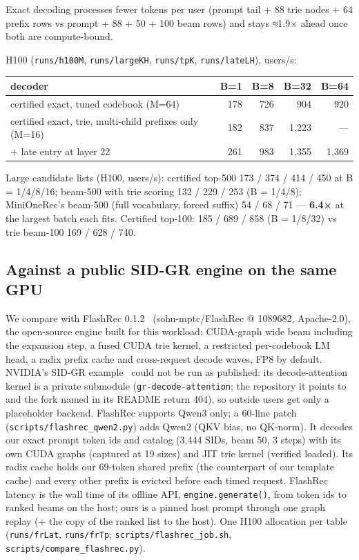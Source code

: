 \documentclass[11pt]{article}
\newcommand{\code}[1]{\texttt{#1}}
\begin{document}
Exact decoding processes fewer tokens per user (prompt tail + 88 trie nodes + 64 prefix rows vs prompt + 88 + 50 + 100 beam rows) and stays ≈1.9× ahead once both are compute-bound.

H100 (\code{runs/\allowbreak{}h100M}, \code{runs/\allowbreak{}largeKH}, \code{runs/\allowbreak{}tpK}, \code{runs/\allowbreak{}lateLH}), users/s:

{\small
\setlength{\tabcolsep}{4pt}
\begin{longtable}{lrrrr}
\toprule
decoder & B=1 & B=8 & B=32 & B=64 \\
\midrule
\endhead
certified exact, tuned codebook (M=64) & 178 & 726 & 904 & 920 \\
certified exact, trie, multi-child prefixes only (M=16) & 182 & 837 & 1,223 & — \\
+ late entry at layer 22 & 261 & 983 & 1,355 & 1,369 \\
\bottomrule
\end{longtable}
}

Large candidate lists (H100, users/s): certified top-500 173 / 374 / 414 / 450 at B = 1/4/8/16; beam-500 with trie scoring 132 / 229 / 253 (B = 1/4/8); MiniOneRec's beam-500 (full vocabulary, forced suffix) 54 / 68 / 71 — \textbf{6.4×} at the largest batch each fits. Certified top-100: 185 / 689 / 858 (B = 1/8/32) vs trie beam-100 169 / 628 / 740.

\subsection{Against a public SID-GR engine on the same GPU}\label{sec:8.1}

We compare with FlashRec 0.1.2~\cite{flashrec} (sohu-mptc/FlashRec @ 1089682, Apache-2.0), the open-source engine built for this workload: CUDA-graph wide beam including the expansion step, a fused CUDA trie kernel, a restricted per-codebook LM head, a radix prefix cache and cross-request decode waves, FP8 by default. NVIDIA's SID-GR example~\cite{nvidiasidgr} could not be run as published: its decode-attention kernel is a private submodule (\code{gr-{}decode-{}attention}; the repository it points to and the fork named in its README return 404), so outside users get only a placeholder backend. FlashRec supports Qwen3 only; a 60-line patch (\code{scripts/\allowbreak{}flashrec\_\allowbreak{}qwen2.py}) adds Qwen2 (QKV bias, no QK-norm). It decodes our exact prompt token ids and catalog (3,444 SIDs, beam 50, 3 steps) with its own CUDA graphs (captured at 19 sizes) and JIT trie kernel (verified loaded). Its radix cache holds our 69-token shared prefix (the counterpart of our template cache) and every other prefix is evicted before each timed request. FlashRec latency is the wall time of its offline API, \code{engine.generate()}, from token ids to ranked beams on the host; ours is a pinned host prompt through one graph replay (+ the copy of the ranked list to the host). One H100 allocation per table (\code{runs/\allowbreak{}frLat}, \code{runs/\allowbreak{}frTp}; \code{scripts/\allowbreak{}flashrec\_\allowbreak{}job.sh}, \code{scripts/\allowbreak{}compare\_\allowbreak{}flashrec.py}).
\end{document}
